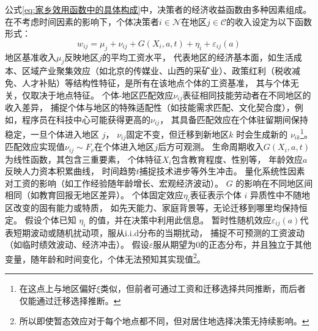 \documentclass[a4paper,12pt,oneside]{book} %
\begin{document}
公式\ref{eq:家乡效用函数中的具体构成}中，决策者的经济收益函数由多种因素组成。在不考虑时间因素的影响下，个体决策者$i \in \mathcal{N}$在地区$j \in \mathcal{C}$的收入设定为以下函数形式：
\begin{equation}
  w_{ij}=\mu_j + \nu_{ij} + G(X_i,a,t) + \eta_i + \varepsilon_{ij}(a)
  \label{eq:经济收益函数}
\end{equation}
地区基准收入$\mu_j$反映地区$j$的平均工资水平，
代表地区的经济基本面，如生活成本、区域产业聚集效应（如北京的传媒业、山西的采矿业）、政策红利（税收减免、人才补贴）等结构性特征，是所有在该地点个体的工资基准，
其与个体无关，仅取决于地点特征。
个体-地区匹配效应$\nu_{ij}$表征相同技能劳动者在不同地区的收入差异，
捕捉个体与地区的特殊适配性（如技能需求匹配、文化契合度），例如，程序员在科技中心可能获得更高的$\nu_{ij}$，
其具备匹配效应在个体驻留期间保持稳定，一旦个体进入地区 $j$，
$\nu_{ij}$固定不变，但迁移到新地区$k$ 时会生成新的 $\nu_{ik}$\footnote{在这点上与地区偏好$\xi$类似，但前者可通过工资和迁移选择共同推断，而后者仅能通过迁移选择推断。}。
匹配效应实现值$\nu_{ij} \sim F_\nu$在个体进入地区$j$后方可观测。
生命周期收入$G(X_i,a,t)$为线性函数，其包含三重要素，
个体特征$X_i$包含教育程度、性别等，
年龄效应$a$反映人力资本积累曲线，
时间趋势$t$捕捉技术进步等外生冲击。
量化系统性因素对工资的影响（如工作经验随年龄增长、宏观经济波动）。
$G$ 的影响在不同地区间相同（如教育回报无地区差异）。
个体固定效应$\eta_i$表征表示个体 $i$ 异质性中不随地区改变的固有能力或特质，
如先天能力、家庭背景等，无论迁移到哪里均保持恒定。
假设个体已知 $\eta_i$ 的值，并在决策中利用此信息。
暂时性随机效应$\varepsilon_{ij}(a)$代表短期波动或随机扰动项，服从i.i.d分布的当期扰动，
捕捉不可预测的工资波动（如临时绩效波动、经济冲击）。
假设$\varepsilon$服从期望为0的正态分布，并且独立于其他变量，随年龄和时间变化，个体无法预知其实现值\footnote{所以即使暂态效应对于每个地点都不同，但对居住地选择决策无持续影响。}。
\end{document}
